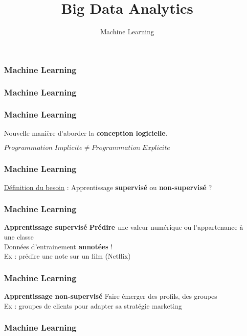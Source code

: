 \documentclass{formation}
\title{Big Data Analytics}
\subtitle{Machine Learning}
\begin{document}
\maketitle

\begin{frame}
  \frametitle{Machine Learning}
\end{frame}

\begin{frame}
  \frametitle{Machine Learning}
\end{frame}

\begin{frame}
  \frametitle{Machine Learning}
  \begin{center}
  Nouvelle manière d'aborder la \textbf{conception logicielle}.
  \end{center}
  \begin{center}
  $\boxed{Programmation\;Implicite \neq Programmation\;Explicite}$
  \end{center}
\end{frame}

\begin{frame}
  \frametitle{Machine Learning}
  \underline{Définition du besoin} :
  \newline
  \newline
  Apprentissage \textbf{supervisé} ou \textbf{non-supervisé} ?
\end{frame}

\begin{frame}
  \frametitle{Machine Learning}
  \textbf{Apprentissage supervisé}
  \newline \newline
  \textbf{Prédire} une valeur numérique ou l'appartenance à une classe\\
  \newline
  Données d'entrainement \textbf{annotées} ! \\
  \newline
  Ex : prédire une note sur un film (Netflix)
\end{frame}

\begin{frame}
  \frametitle{Machine Learning}
  \textbf{Apprentissage non-supervisé}
  \newline \newline
  Faire émerger des profils, des groupes \\
  \newline
  Ex : groupes de clients pour adapter sa stratégie marketing \\
\end{frame}

\begin{frame}
  \frametitle{Machine Learning}
\end{frame}
\end{document}
